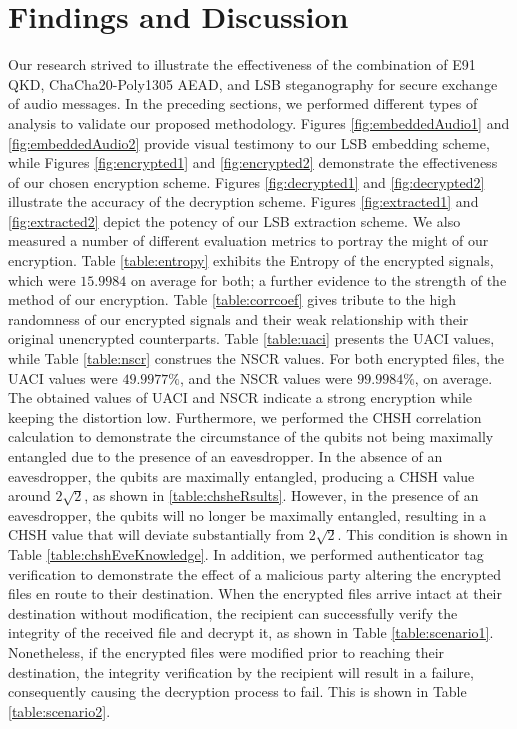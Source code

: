 \documentclass[a4paper]{cas-sc}
\begin{document}
\section{Findings and Discussion}
\label{sec:discussion}
Our research strived to illustrate the effectiveness of the combination of E91 QKD, ChaCha20-Poly1305 AEAD, and LSB steganography for secure exchange of audio messages. In the preceding sections, we performed different types of analysis to validate our proposed methodology. Figures \ref{fig:embeddedAudio1} and \ref{fig:embeddedAudio2} provide visual testimony to our LSB embedding scheme, while Figures \ref{fig:encrypted1} and \ref{fig:encrypted2} demonstrate the effectiveness of our chosen encryption scheme. Figures \ref{fig:decrypted1} and \ref{fig:decrypted2} illustrate the accuracy of the decryption scheme. Figures \ref{fig:extracted1} and \ref{fig:extracted2} depict the potency of our LSB extraction scheme. We also measured a number of different evaluation metrics to portray the might of our encryption. Table \ref{table:entropy} exhibits the Entropy of the encrypted signals, which were $15.9984$ on average for both; a further evidence to the strength of the method of our encryption. Table \ref{table:corrcoef} gives tribute to the high randomness of our encrypted signals and their weak relationship with their original unencrypted counterparts. Table \ref{table:uaci} presents the UACI values, while Table \ref{table:nscr} construes the NSCR values. For both encrypted files, the UACI values were $49.9977\%$, and the NSCR values were $99.9984\%$, on average. The obtained values of UACI and NSCR indicate a strong encryption while keeping the distortion low. Furthermore, we performed the CHSH correlation calculation to demonstrate the circumstance of the qubits not being maximally entangled due to the presence of an eavesdropper. In the absence of an eavesdropper, the qubits are maximally entangled, producing a CHSH value around $2\sqrt{2}$, as shown in \ref{table:chsheRsults}. However, in the presence of an eavesdropper, the qubits will no longer be maximally entangled, resulting in a CHSH value that will deviate substantially from $2\sqrt{2}$. This condition is shown in Table \ref{table:chshEveKnowledge}. In addition, we performed authenticator tag verification to demonstrate the effect of a malicious party altering the encrypted files en route to their destination. When the encrypted files arrive intact at their destination without modification, the recipient can successfully verify the integrity of the received file and decrypt it, as shown in Table \ref{table:scenario1}. Nonetheless, if the encrypted files were modified prior to reaching their destination, the integrity verification by the recipient will result in a failure, consequently causing the decryption process to fail. This is shown in Table \ref{table:scenario2}.
\end{document}
